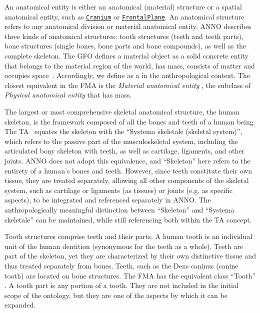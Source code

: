 \documentclass[sw]{iosart2x}
\newcommand{\anno}[1]{\href{https://annosaxfdm.de/ontology/#1}{\texttt{#1}}}
\begin{document}
An anatomical entity is either an anatomical (material) structure or a spatial anatomical entity, such as \anno{Cranium} or \anno{FrontalPlane}.
An anatomical structure refers to any anatomical division or material anatomical entity.
ANNO describes three kinds of anatomical structures: tooth structures (teeth and teeth parts), bone structures (single bones, bone parts and bone compounds), as well as the complete skeleton.
The GFO defines a material object  as a solid concrete entity that belongs to the material region of the world, has mass, consists of matter and occupies space~\citep{gfospace}.
Accordingly, we define  as a  in the anthropological context.
The closest equivalent in the FMA is the \emph{Material anatomical entity} , the subclass of \emph{Physical anatomical entity}  that has mass.

The largest or most comprehensive skeletal anatomical structure, the human skeleton, is the framework composed of all the bones and teeth of a human being.
The TA~\citep{ta2} equates the skeleton with the \enquote{Systema skeletale (skeletal system)}, which refers to the passive part of the musculoskeletal system, including the articulated bony skeleton with teeth, as well as cartilage, ligaments, and other joints.
ANNO does not adopt this equivalence, and \enquote{Skeleton} here refers to the entirety of a human's bones and teeth.
However, since teeth constitute their own tissue, they are treated separately, allowing all other components of the skeletal system, such as cartilage or ligaments (as tissues) or joints (e.g. as specific aspects), to be integrated and referenced separately in ANNO.
The anthropologically meaningful distinction between \enquote{Skeleton} and \enquote{Systema skeletale} can be maintained, while still referencing both within the TA concept.

Tooth structures comprise teeth and their parts.
A human tooth is an individual unit of the human dentition (synonymous for the teeth as a whole).
Teeth are part of the skeleton, yet they are characterized by their own distinctive tissue and thus treated separately from bones.
Teeth, such as the Dens caninus (canine tooth) are located on bone structures.
The FMA has the equivalent class \enquote{Tooth} .
A tooth part is any portion of a tooth.
They are not included in the initial scope of the ontology, but they are one of the aspects by which it can be expanded.
\end{document}
